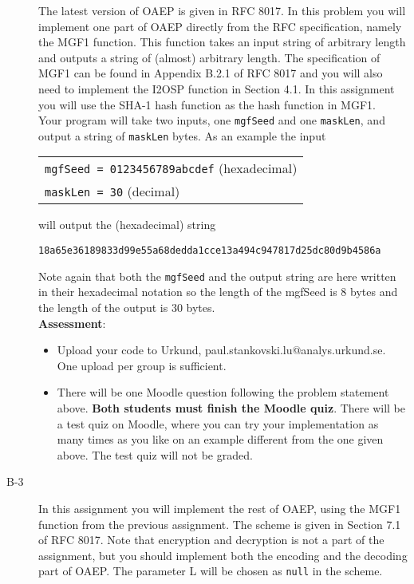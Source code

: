 \documentclass{article}
\begin{document}
\begin{description}
{				The latest version of OAEP is given in RFC 8017. In this problem you will implement one part of OAEP directly from the RFC specification, namely the MGF1 function. This function takes an input string of arbitrary length and outputs a string of (almost) arbitrary length. The specification of MGF1 can be found in Appendix B.2.1 of RFC 8017 and you will also need to implement the I2OSP function in Section 4.1. In this assignment you will use the SHA-1 hash function as the hash function in MGF1.\\
				Your program will take two inputs, one \texttt{mgfSeed} and one \texttt{maskLen}, and output a string of \texttt{maskLen} bytes.
				As an example the input
				\begin{center}
					\begin{tabular}{l}
						\texttt{mgfSeed = 0123456789abcdef} (hexadecimal)\\
						\texttt{maskLen = 30} (decimal)\\
					\end{tabular}
				\end{center}
				will output the (hexadecimal) string
				\begin{center}
					\texttt{18a65e36189833d99e55a68dedda1cce13a494c947817d25dc80d9b4586a}\\
				\end{center}
				Note again that both the \texttt{mgfSeed} and the output string are here written in their hexadecimal notation so the length of the mgfSeed is 8 bytes and the length of the output is 30 bytes.\\
				\textbf{Assessment}:
				\begin{itemize}
					\item Upload your code to Urkund, paul.stankovski.lu@analys.urkund.se.
					One upload per group is sufficient.
					
					\item There will be one Moodle question following the problem statement above. 
					\textbf{Both students must finish the Moodle quiz}.
					There will be a test quiz on Moodle, where you can try your implementation as many times as you like on an example different from the one given above. The test quiz will not be graded.
				\end{itemize}
			}
			\item[B-3]{In this assignment you will implement the rest of OAEP, using the MGF1 function from the previous assignment. The scheme is given in Section 7.1 of RFC 8017. Note that encryption and decryption is not a part of the assignment, but you should implement both the encoding and the decoding part of OAEP. The parameter L will be chosen as \texttt{null} in the scheme.
				
}
\end{description}
\end{document}
